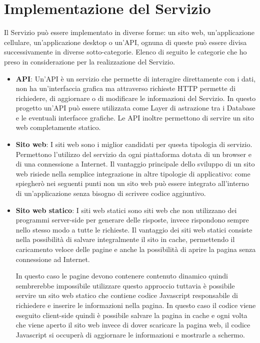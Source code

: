 \section{Implementazione del Servizio}
Il Servizio pu\`o essere implementato in diverse forme: un sito web, un'applicazione cellulare, un'applicazione desktop o un'API\@, ognuna di queste pu\`o essere divisa successivamente in diverse sotto-categorie. Elenco di seguito le categorie che ho preso in considerazione per la realizzazione del Servizio.

\begin{itemize}
    \item \textbf{API}: Un'API \`e un servizio che permette di interagire direttamente con i dati, non ha un'interfaccia grafica ma attraverso richieste HTTP permette di richiedere, di aggiornare o di modificare le informazioni del Servizio. In questo progetto un'API pu\`o essere utilizzata come Layer di astrazione tra i Database e le eventuali interfacce grafiche. Le API inoltre permettono di servire un sito web completamente statico.
    \item \textbf{Sito web}: I siti web sono i miglior candidati per questa tipologia di servizio. Permettono l'utilizzo del servizio da ogni piattaforma dotata di un browser e di una connessione a Internet. Il vantaggio principale dello sviluppo di un sito web risiede nella semplice integrazione in altre tipologie di applicativo: come spiegher\`o nei seguenti punti non un sito web pu\`o essere integrato all'interno di un'applicazione senza bisogno di scrivere codice aggiuntivo.
    \item \textbf{Sito web statico}: I siti web statici sono siti web che non utilizzano dei programmi server-side per generare delle risposte, invece rispondono sempre nello stesso modo a tutte le richieste. Il vantaggio dei siti web statici consiste nella possibilit\`a di salvare integralmente il sito in cache, permettendo il caricamento veloce delle pagine e anche la possibilit\`a di aprire la pagina senza connessione ad Internet.
    
    In questo caso le pagine devono contenere contenuto dinamico quindi sembrerebbe impossibile utilizzare questo approccio tuttavia \`e possibile servire un sito web statico che contiene codice Javascript responsabile di richiedere e inserire le informazioni nella pagina. In questo caso il codice viene eseguito client-side quindi \`e possibile salvare la pagina in cache e ogni volta che viene aperto il sito web invece di dover scaricare la pagina web, il codice Javascript si occuper\`a di aggiornare le informazioni e mostrarle a schermo.


\end{itemize}

